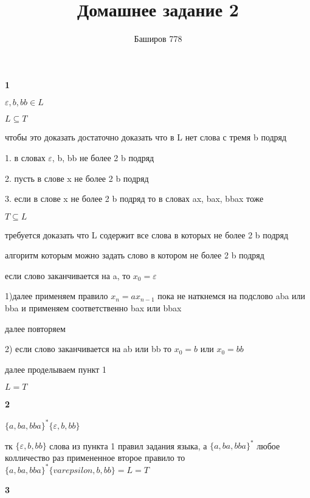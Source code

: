 \documentclass[a4paper,12pt]{article}
\author{Баширов 778}
\title{Домашнее задание 2}
\begin{document}
\maketitle
\newpage
\section{}

\textbf{1}

$ \varepsilon, b, bb \in L $

$ L \subseteq T$

чтобы это доказать достаточно доказать что в L нет слова с тремя b подряд

1. в словах $\varepsilon$, b, bb не более 2 b подряд

2. пусть в слове x не более 2 b подряд

3. если  в слове x не более 2 b подряд то в словах ax, bax, bbax тоже

$ T \subseteq L$

требуется доказать что L содержит все слова в которых не более 2 b подряд

алгоритм которым можно задать слово в котором не более 2 b подряд

если слово заканчивается на a, то $x_0 = \varepsilon$

1)далее применяем правило $x_n = ax_{n-1}$ пока не наткнемся на подслово aba или bba и применяем соответственно bax или bbax

далее повторяем

2) если слово заканчивается на ab или bb то $x_0 = b$ или $x_0 = bb$

далее проделываем пункт 1 

$L = T$ 

\textbf{2}

$\{a, ba, bba\}^*\{\varepsilon, b, bb\}$

тк $\{\varepsilon, b, bb\}$ слова из пункта 1 правил задания языка, а $\{a, ba, bba\}^*$ любое колличество раз примененное второе правило то $\{a, ba, bba\}^*\{varepsilon, b, bb\} = L = T$

\textbf{3}

\begin{center}
\end{center}
\end{document}
